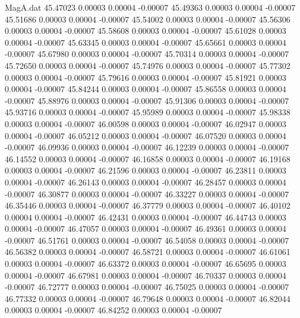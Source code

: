 \begin{filecontents}{MagA.dat}
  45.47023    0.00003    0.00004   -0.00007
  45.49363    0.00003    0.00004   -0.00007
  45.51686    0.00003    0.00004   -0.00007
  45.54002    0.00003    0.00004   -0.00007
  45.56306    0.00003    0.00004   -0.00007
  45.58608    0.00003    0.00004   -0.00007
  45.61028    0.00003    0.00004   -0.00007
  45.63345    0.00003    0.00004   -0.00007
  45.65661    0.00003    0.00004   -0.00007
  45.67980    0.00003    0.00004   -0.00007
  45.70314    0.00003    0.00004   -0.00007
  45.72650    0.00003    0.00004   -0.00007
  45.74976    0.00003    0.00004   -0.00007
  45.77302    0.00003    0.00004   -0.00007
  45.79616    0.00003    0.00004   -0.00007
  45.81921    0.00003    0.00004   -0.00007
  45.84244    0.00003    0.00004   -0.00007
  45.86558    0.00003    0.00004   -0.00007
  45.88976    0.00003    0.00004   -0.00007
  45.91306    0.00003    0.00004   -0.00007
  45.93716    0.00003    0.00004   -0.00007
  45.95989    0.00003    0.00004   -0.00007
  45.98338    0.00003    0.00004   -0.00007
  46.00598    0.00003    0.00004   -0.00007
  46.02947    0.00003    0.00004   -0.00007
  46.05212    0.00003    0.00004   -0.00007
  46.07520    0.00003    0.00004   -0.00007
  46.09936    0.00003    0.00004   -0.00007
  46.12239    0.00003    0.00004   -0.00007
  46.14552    0.00003    0.00004   -0.00007
  46.16858    0.00003    0.00004   -0.00007
  46.19168    0.00003    0.00004   -0.00007
  46.21596    0.00003    0.00004   -0.00007
  46.23811    0.00003    0.00004   -0.00007
  46.26143    0.00003    0.00004   -0.00007
  46.28457    0.00003    0.00004   -0.00007
  46.30877    0.00003    0.00004   -0.00007
  46.33227    0.00003    0.00004   -0.00007
  46.35446    0.00003    0.00004   -0.00007
  46.37779    0.00003    0.00004   -0.00007
  46.40102    0.00004    0.00004   -0.00007
  46.42431    0.00003    0.00004   -0.00007
  46.44743    0.00003    0.00004   -0.00007
  46.47057    0.00003    0.00004   -0.00007
  46.49361    0.00003    0.00004   -0.00007
  46.51761    0.00003    0.00004   -0.00007
  46.54058    0.00003    0.00004   -0.00007
  46.56382    0.00003    0.00004   -0.00007
  46.58721    0.00003    0.00004   -0.00007
  46.61061    0.00003    0.00004   -0.00007
  46.63372    0.00003    0.00004   -0.00007
  46.65695    0.00003    0.00004   -0.00007
  46.67981    0.00003    0.00004   -0.00007
  46.70337    0.00003    0.00004   -0.00007
  46.72777    0.00003    0.00004   -0.00007
  46.75025    0.00003    0.00004   -0.00007
  46.77332    0.00003    0.00004   -0.00007
  46.79648    0.00003    0.00004   -0.00007
  46.82044    0.00003    0.00004   -0.00007
  46.84252    0.00003    0.00004   -0.00007

\end{filecontents}
